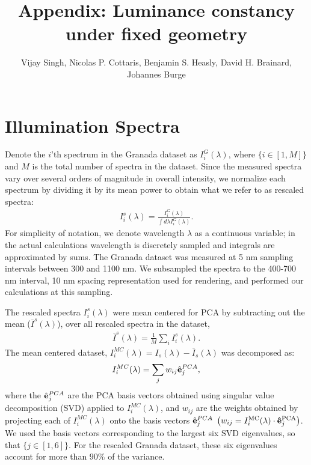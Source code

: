 \documentclass[10pt,english]{article}
\date{}
\begin{document}
\title{Appendix: Luminance constancy under fixed geometry}

\author{Vijay Singh, Nicolas P. Cottaris, Benjamin S. Heasly, David H. Brainard, Johannes Burge}
\maketitle



\section{Illumination Spectra}
Denote the $i$'th spectrum in the Granada dataset as $I^G_i(\lambda)$, where $\{i \in [1,M]\}$ and $M$ is the total number of spectra in the dataset. 
Since the measured spectra vary over several orders of magnitude in overall intensity, we normalize each spectrum by dividing it by its mean power to obtain what we refer to as rescaled spectra:
\begin{align}
I_i^s(\lambda) = \frac{I^G_i(\lambda)}{\int d\lambda I^G_i(\lambda)}.
\end{align}
For simplicity of notation, we denote wavelength $\lambda$ as a continuous variable; in the actual calculations wavelength is discretely sampled and integrals are approximated by sums. 
The Granada dataset was measured at 5 nm sampling intervals between 300 and 1100 nm.  
We subsampled the spectra to the 400-700 nm interval, 10 nm spacing representation used for rendering, and performed our calculations at this sampling.

The rescaled spectra $I_i^s(\lambda)$ were mean centered for PCA by subtracting out the mean ($\bar{I}^{s}(\lambda)$),  over all rescaled spectra in the dataset, 
\begin{align}
\bar{I}^{s}(\lambda) = \frac{1}{M}\sum_i{I_i^s(\lambda)}.
\end{align} 
The mean centered dataset, $I_i^{MC}(\lambda) = I_{s}(\lambda) - \bar{I}_{s}(\lambda)$
was decomposed as:
\begin{align}
I_i^{MC}(\lambda) = \sum_j w_{ij}\hat{{\bf e}}_j^{PCA},
\end{align}
where the $\hat{{\bf e}}_j^{PCA}$ are the PCA basis vectors obtained using
singular value decomposition (SVD) applied to $I_i^{MC}(\lambda)$, 
and $w_{ij}$ are the weights obtained by projecting each of $I_i^{MC}(\lambda)$ onto the basis vectors $\hat{{\bf e}}_j^{PCA}$ $\left( w_{ij} = I_i^{\rm MC}(\lambda)\cdot {\bf \hat{e}}_j^{\rm PCA}\right)$.
We used the basis vectors corresponding to
the largest six SVD eigenvalues, so that $\{j \in [1,6]\}$.
For the rescaled Granada dataset, these six  eigenvalues account for more than $90\%$ of the variance.
\end{document}
